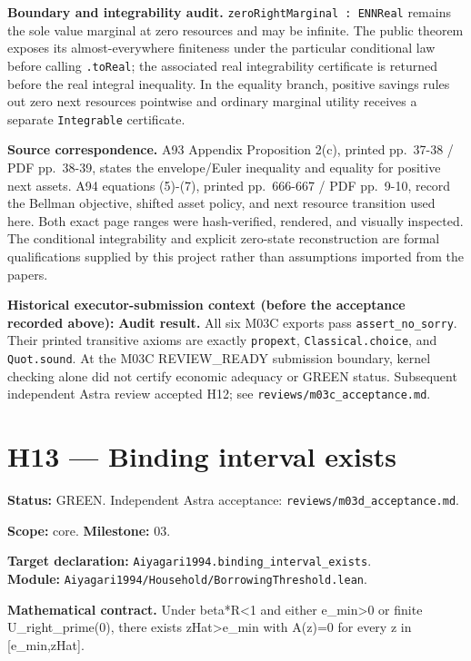\documentclass[
  11pt,
]{article}
\let\LedgerOriginalTexttt\texttt
\renewcommand{\texttt}[1]{{\small\LedgerOriginalTexttt{#1}}}
\begin{document}
\textbf{Boundary and integrability audit.}
\texttt{zeroRightMarginal\ :\ ENNReal} remains the sole value marginal
at zero resources and may be infinite. The public theorem exposes its
almost-everywhere finiteness under the particular conditional law before
calling \texttt{.toReal}; the associated real integrability certificate
is returned before the real integral inequality. In the equality branch,
positive savings rules out zero next resources pointwise and ordinary
marginal utility receives a separate \texttt{Integrable} certificate.

\textbf{Source correspondence.} A93 Appendix Proposition 2(c), printed
pp.~37-38 / PDF pp.~38-39, states the envelope/Euler inequality and
equality for positive next assets. A94 equations (5)-(7), printed
pp.~666-667 / PDF pp.~9-10, record the Bellman objective, shifted asset
policy, and next resource transition used here. Both exact page ranges
were hash-verified, rendered, and visually inspected. The conditional
integrability and explicit zero-state reconstruction are formal
qualifications supplied by this project rather than assumptions imported
from the papers.

\textbf{Historical executor-submission context (before the acceptance
recorded above):} \textbf{Audit result.} All six M03C exports pass
\texttt{assert\_no\_sorry}. Their printed transitive axioms are exactly
\texttt{propext}, \texttt{Classical.choice}, and \texttt{Quot.sound}. At
the M03C REVIEW\_READY submission boundary, kernel checking alone did
not certify economic adequacy or GREEN status. Subsequent independent
Astra review accepted H12; see \texttt{reviews/m03c\_acceptance.md}.

\section{H13 --- Binding interval
exists}\label{h13-binding-interval-exists}

\textbf{Status:} GREEN. Independent Astra acceptance:
\texttt{reviews/m03d\_acceptance.md}.

\textbf{Scope:} core. \textbf{Milestone:} 03.

\textbf{Target declaration:}
\texttt{Aiyagari1994.binding\_interval\_exists}.\\
\textbf{Module:}
\texttt{Aiyagari1994/Household/BorrowingThreshold.lean}.

\textbf{Mathematical contract.} Under beta*R\textless1 and either
e\_min\textgreater0 or finite U\_right\_prime(0), there exists
zHat\textgreater e\_min with A(z)=0 for every z in {[}e\_min,zHat{]}.
\end{document}
